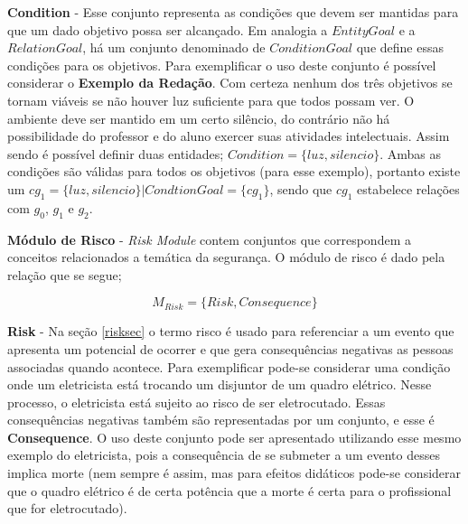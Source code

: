 \textbf{Condition} - Esse conjunto representa as condições que devem ser mantidas para que um dado objetivo possa ser alcançado. 
Em analogia a $EntityGoal$ e a $RelationGoal$, há um conjunto denominado de $ConditionGoal$ que define essas condições 
para os objetivos. Para exemplificar o uso deste conjunto é possível considerar o \textbf{Exemplo da Redação}. Com certeza
nenhum dos três objetivos se tornam viáveis se não houver luz suficiente para que todos possam ver. O ambiente deve ser mantido 
em um certo silêncio, do contrário não há possibilidade do professor e do aluno exercer suas atividades intelectuais. Assim sendo
é possível definir duas entidades; $Condition = \{ luz,silencio \}$. Ambas as condições são válidas para todos os objetivos (para esse
exemplo), portanto existe um $cg_1 = \{ luz,silencio \} | CondtionGoal = \{ cg_1 \}$, sendo que $cg_1$ estabelece relações com 
$g_0$, $g_1$ e $g_2$.

\textbf{Módulo de Risco} - \textit{Risk Module} contem conjuntos que correspondem a conceitos relacionados a temática da segurança.
O módulo de risco é dado pela relação que se segue;

\begin{equation}
    M_{Risk} = \{ Risk, Consequence \}
\end{equation}

\textbf{Risk} - Na seção \ref{risksec} o termo risco é usado para referenciar a um evento que apresenta um potencial de ocorrer e que 
gera consequências negativas as pessoas associadas quando acontece. Para exemplificar pode-se considerar uma condição onde um eletricista 
está trocando um disjuntor de um quadro elétrico. Nesse processo, o eletricista está sujeito ao risco de ser eletrocutado. Essas 
consequências negativas também são representadas por um conjunto, e esse é \textbf{Consequence}. O uso deste conjunto pode ser 
apresentado utilizando esse mesmo exemplo do eletricista, pois a consequência de se submeter a um evento desses implica morte (nem sempre é assim, mas para efeitos didáticos pode-se considerar que o quadro elétrico é de certa potência que a morte é certa para o profissional
que for eletrocutado).
